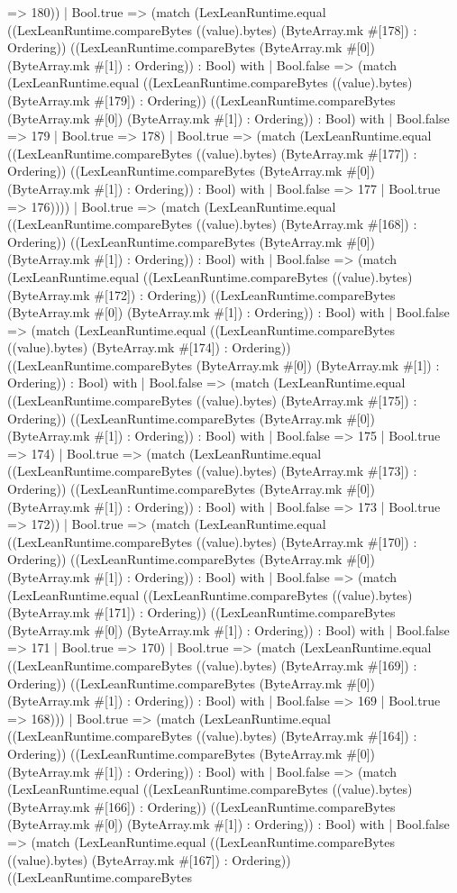 \documentclass[11pt]{article}
\begin{document}
=> 180)) | Bool.true => (match (LexLeanRuntime.equal ((LexLeanRuntime.compareBytes ((value).bytes) (ByteArray.mk \#[178]) : Ordering)) ((LexLeanRuntime.compareBytes (ByteArray.mk \#[0]) (ByteArray.mk \#[1]) : Ordering)) : Bool) with | Bool.false => (match (LexLeanRuntime.equal ((LexLeanRuntime.compareBytes ((value).bytes) (ByteArray.mk \#[179]) : Ordering)) ((LexLeanRuntime.compareBytes (ByteArray.mk \#[0]) (ByteArray.mk \#[1]) : Ordering)) : Bool) with | Bool.false => 179 | Bool.true => 178) | Bool.true => (match (LexLeanRuntime.equal ((LexLeanRuntime.compareBytes ((value).bytes) (ByteArray.mk \#[177]) : Ordering)) ((LexLeanRuntime.compareBytes (ByteArray.mk \#[0]) (ByteArray.mk \#[1]) : Ordering)) : Bool) with | Bool.false => 177 | Bool.true => 176)))) | Bool.true => (match (LexLeanRuntime.equal ((LexLeanRuntime.compareBytes ((value).bytes) (ByteArray.mk \#[168]) : Ordering)) ((LexLeanRuntime.compareBytes (ByteArray.mk \#[0]) (ByteArray.mk \#[1]) : Ordering)) : Bool) with | Bool.false => (match (LexLeanRuntime.equal ((LexLeanRuntime.compareBytes ((value).bytes) (ByteArray.mk \#[172]) : Ordering)) ((LexLeanRuntime.compareBytes (ByteArray.mk \#[0]) (ByteArray.mk \#[1]) : Ordering)) : Bool) with | Bool.false => (match (LexLeanRuntime.equal ((LexLeanRuntime.compareBytes ((value).bytes) (ByteArray.mk \#[174]) : Ordering)) ((LexLeanRuntime.compareBytes (ByteArray.mk \#[0]) (ByteArray.mk \#[1]) : Ordering)) : Bool) with | Bool.false => (match (LexLeanRuntime.equal ((LexLeanRuntime.compareBytes ((value).bytes) (ByteArray.mk \#[175]) : Ordering)) ((LexLeanRuntime.compareBytes (ByteArray.mk \#[0]) (ByteArray.mk \#[1]) : Ordering)) : Bool) with | Bool.false => 175 | Bool.true => 174) | Bool.true => (match (LexLeanRuntime.equal ((LexLeanRuntime.compareBytes ((value).bytes) (ByteArray.mk \#[173]) : Ordering)) ((LexLeanRuntime.compareBytes (ByteArray.mk \#[0]) (ByteArray.mk \#[1]) : Ordering)) : Bool) with | Bool.false => 173 | Bool.true => 172)) | Bool.true => (match (LexLeanRuntime.equal ((LexLeanRuntime.compareBytes ((value).bytes) (ByteArray.mk \#[170]) : Ordering)) ((LexLeanRuntime.compareBytes (ByteArray.mk \#[0]) (ByteArray.mk \#[1]) : Ordering)) : Bool) with | Bool.false => (match (LexLeanRuntime.equal ((LexLeanRuntime.compareBytes ((value).bytes) (ByteArray.mk \#[171]) : Ordering)) ((LexLeanRuntime.compareBytes (ByteArray.mk \#[0]) (ByteArray.mk \#[1]) : Ordering)) : Bool) with | Bool.false => 171 | Bool.true => 170) | Bool.true => (match (LexLeanRuntime.equal ((LexLeanRuntime.compareBytes ((value).bytes) (ByteArray.mk \#[169]) : Ordering)) ((LexLeanRuntime.compareBytes (ByteArray.mk \#[0]) (ByteArray.mk \#[1]) : Ordering)) : Bool) with | Bool.false => 169 | Bool.true => 168))) | Bool.true => (match (LexLeanRuntime.equal ((LexLeanRuntime.compareBytes ((value).bytes) (ByteArray.mk \#[164]) : Ordering)) ((LexLeanRuntime.compareBytes (ByteArray.mk \#[0]) (ByteArray.mk \#[1]) : Ordering)) : Bool) with | Bool.false => (match (LexLeanRuntime.equal ((LexLeanRuntime.compareBytes ((value).bytes) (ByteArray.mk \#[166]) : Ordering)) ((LexLeanRuntime.compareBytes (ByteArray.mk \#[0]) (ByteArray.mk \#[1]) : Ordering)) : Bool) with | Bool.false => (match (LexLeanRuntime.equal ((LexLeanRuntime.compareBytes ((value).bytes) (ByteArray.mk \#[167]) : Ordering)) ((LexLeanRuntime.compareBytes 
\end{document}
